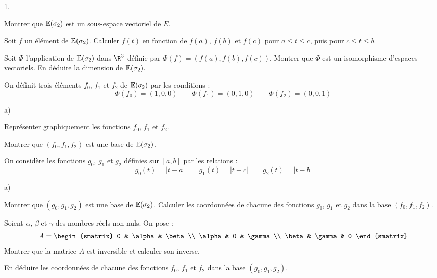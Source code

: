 \documentclass[11pt]{article}%
\begin{document}
\begin{noliste}{1.}
 \setlength{\itemsep}{4mm}
\item Montrer que $\mathbb{E}(\sigma_{2})$ est un sous-espace vectoriel de $E$.

\item Soit $f$ un élément de $\mathbb{E}(\sigma_{2})$. Calculer $f(t)$ en
fonction
de $f(a)$, $f(b)$ et $f(c)$ pour $a\leq t\leq c$, puis pour $c\leq
t\leq b$.

\item Soit $\Phi $ l'application de $\mathbb{E}(\sigma_{2})$ dans $\R^{3}$
définie par $\Phi (f) = (f(a),f(b),f(c))$. Montrer que $\Phi $ est un
isomorphisme d'espaces vectoriels. En déduire la dimension de
$\mathbb{E}(\sigma
_{2}) $.

\item On définit trois éléments $f_{0}$, $f_{1}$ et $f_{2}$ de
$\mathbb{E}(\sigma
_{2})$ par les conditions : 
\[
\Phi (f_{0}) = (1,0,0)\qquad \Phi (f_{1}) = (0,1,0)\qquad \Phi (f_{2})
= (0,0,1)
\]

\begin{noliste}{a)}
 \setlength{\itemsep}{2mm}
\item Représenter graphiquement les fonctions $f_{0}$, $f_{1}$ et
$f_{2}$.

\item Montrer que $(f_{0},f_{1},f_{2})$ est une base de
$\mathbb{E}(\sigma_{2})$.
\end{noliste}

\item On considère les fonctions $g_{0}$, $g_{1}$ et $g_{2}$ définies
sur $[a,b]$ par les relations : 
\[
g_{0}(t) = \left| t-a\right| \qquad g_{1}(t) = \left| t-c\right|
\qquad g_{2}(t) = \left| t-b\right|
\]

\begin{noliste}{a)}
 \setlength{\itemsep}{2mm}
\item Montrer que $(g_{0},g_{1},g_{2})$ est une base de
$\mathbb{E}(\sigma_{2})$.
Calculer les coordonnées de chacune des fonctions $g_{0}$, $g_{1}$ et
$g_{2}$
dans la base $(f_{0},f_{1},f_{2})$.

\item Soient $\alpha $, $\beta $ et $\gamma $ des nombres réels non
nuls. On
pose : 
\[
A = 
\begin{smatrix}
0 & \alpha & \beta \\
\alpha & 0 & \gamma \\
\beta & \gamma & 0
\end{smatrix}
\]
Montrer que la matrice $A$ est inversible et calculer son inverse.

\item En déduire les coordonnées de chacune des fonctions $f_{0}$,
$f_{1}$
et $f_{2}$ dans la base $(g_{0},g_{1},g_{2})$.
\end{noliste}
\end{noliste}
\end{document}
